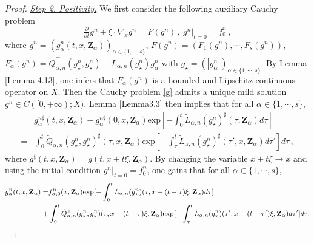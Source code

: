 \documentclass[reqno,11pt]{amsart}
\numberwithin{equation}{section}
\def\exp{\mathrm{exp}}
\begin{document}
\begin{proof}
\underline{\em Step 2. Positivity.} We first consider the following auxiliary Cauchy problem 
	\begin{equation} \label{g}
			\tfrac{\partial }{\partial t} g^n  +\xi \cdot \nabla_x g^n = F(g^n) \,, \ g^n|_{t=0} = f^n_{0} \,,
	\end{equation}
	where $g^n = ( g^n_{\alpha} (t, x, \mathbf{Z}_\alpha) )_{\alpha \in \{ 1, \cdots, s \}}$, $F(g^n)=(F_{1 }(g^n),\cdots,F_{s }(g^n))$, $ F_{\alpha }(g^n)=\tilde{Q}_{\alpha ,n}^+ ( g^n_\star , g^n_\star ) - \tilde{L} _{\alpha, n} ( g^n_\star ) g^n_\alpha $ with $g_\star = ( |g^n_\alpha| )_{\alpha \in \{ 1, \cdots, s \}}$. By Lemma \ref{Lemma 4.13}, one infers that $F_\alpha (g^n)$ is a bounded and Lipschitz continuous operator on $X$. Then the Cauchy problem \eqref{g} admits a unique mild solution $g^n \in C([0,+\infty ); X )$. Lemma \ref{Lemma3.3} then implies that for all $\alpha \in \{ 1, \cdots, s \}$,
\begin{equation*}
\begin{aligned}
& g^{n \sharp}_\alpha (t, x, \mathbf{Z}_\alpha) - g^{n\sharp}_\alpha (0, x, \mathbf{Z}_\alpha ) \exp [ - \int_{0}^{t} \tilde{L}_{\alpha ,n } ( g^n_\star)^\sharp (\tau, \mathbf{Z}_\alpha ) d \tau ] \\
= & \int_{0}^{t} \tilde{Q}^+_{\alpha ,n} ( g^n_\star, g^n_\star )^\sharp (\tau, x, \mathbf{Z}_\alpha ) \exp [- \int_{\tau}^{t} \tilde{L}_{\alpha ,n } ( g^n_\star)^\sharp (\tau', x, \mathbf{Z}_\alpha ) d \tau' ] d \tau \,,
\end{aligned}
\end{equation*}
where $g^\sharp (t, x, \mathbf{Z}_\alpha) = g (t, x + t \xi, \mathbf{Z}_\alpha)$. By changing the variable $x+t\xi \rightarrow x$ and using the initial condition $g^n |_{t= 0} = f_0^n$, one gains that for all $\alpha \in \{ 1, \cdots, s \}$,
	\begin{equation*}{\small
		\begin{aligned}
			g^n_\alpha (t,x,\mathbf{Z}_\alpha) = & f_{\alpha, 0}^n (x, \mathbf{Z}_\alpha) \exp [ - \int_{0}^{t} \tilde{L}_{\alpha ,n } ( g^n_\star ) (\tau, x - (t - \tau ) \xi, \mathbf{Z}_\alpha ) d \tau ] \\
			+ & \int_{0}^{t} \tilde{Q}^+_{\alpha ,n} ( g^n_\star, g^n_\star ) (\tau, x - (t - \tau) \xi, \mathbf{Z}_\alpha ) \exp [ - \int_{\tau}^{t} \tilde{L}_{\alpha ,n } ( g^n_\star) (\tau' , x - (t - \tau') \xi, \mathbf{Z}_\alpha ) d \tau' ] d \tau .
		\end{aligned}}
	\end{equation*}

\end{proof}
\end{document}
